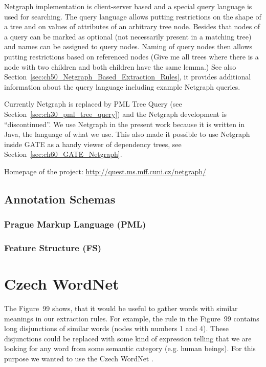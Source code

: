 Netgraph implementation is client-server based and a special query language is used for searching. The query language allows putting restrictions on the shape of a tree and on values of attributes of an arbitrary tree node. Besides that nodes of a query can be marked as optional (not necessarily present in a matching tree) and names can be assigned to query nodes. Naming of query nodes then allows putting restrictions based on referenced nodes (Give me all trees where there is a node with two children and both children have the same lemma.) See also Section~\ref{sec:ch50_Netgraph_Based_Extraction_Rules}, it provides additional information about the query language including example Netgraph queries.

Currently Netgraph is replaced by PML Tree Query (see Section~\ref{sec:ch30_pml_tree_query}) and the Netgraph development is ``discontinued''. We use Netgraph in the present work because it is written in Java, the language of what we use. This also made it possible to use Netgraph inside GATE as a handy viewer of dependency trees, see Section~\ref{sec:ch60_GATE_Netgraph}. 

\medskip
Homepage of the project: \url{http://quest.ms.mff.cuni.cz/netgraph/}


\subsection{Annotation Schemas}
\subsubsection{Prague Markup Language (PML)} \label{sec:ch30_pml}
\subsubsection{Feature Structure (FS)} \label{sec:ch30_fs}


\section{Czech WordNet}

The Figure~99 shows, that it would be useful to gather words with similar meanings in our extraction rules. For example, the rule in the Figure~99 contains long disjunctions of similar words (nodes with numbers 1 and 4). These disjunctions could be replaced with some kind of expression telling that we are looking for any word from some semantic category (e.g. human beings). For this purpose we wanted to use the Czech WordNet \citep{biblio:WordNetCZ2004}. 

